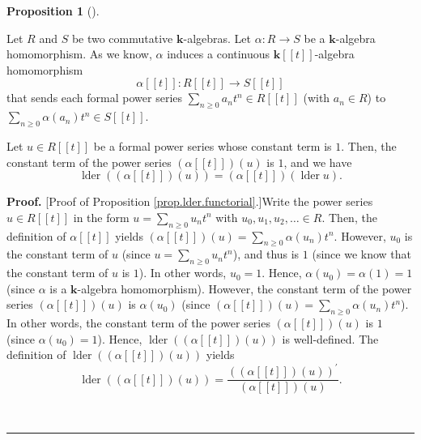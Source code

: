 \documentclass[numbers=enddot,12pt,final,onecolumn,notitlepage]{scrartcl}%
\theoremstyle{definition}
\newtheorem{prop}[theo]{Proposition}
\newenvironment{proposition}[1][]
{\begin{prop}[#1]\begin{leftbar}}
{\end{leftbar}\end{prop}}
\newenvironment{proof}[1][Proof]{\noindent\textbf{#1.} }{\ \rule{0.5em}{0.5em}}
\let\sumnonlimits\sum
\renewcommand{\sum}{\sumnonlimits\limits}
\newenvironment{verlong}{}{}
\begin{document}
\begin{verlong}
\begin{proposition}
\label{prop.lder.functorial}Let $R$ and $S$ be two commutative $\mathbf{k}%
$-algebras. Let $\alpha:R\rightarrow S$ be a $\mathbf{k}$-algebra
homomorphism. As we know, $\alpha$ induces a continuous $\mathbf{k}\left[
\left[  t\right]  \right]  $-algebra homomorphism%
\[
\alpha\left[  \left[  t\right]  \right]  :R\left[  \left[  t\right]  \right]
\rightarrow S\left[  \left[  t\right]  \right]
\]
that sends each formal power series $\sum_{n\geq0}a_{n}t^{n}\in R\left[
\left[  t\right]  \right]  $ (with $a_{n}\in R$) to $\sum_{n\geq0}%
\alpha\left(  a_{n}\right)  t^{n}\in S\left[  \left[  t\right]  \right]  $.

Let $u\in R\left[  \left[  t\right]  \right]  $ be a formal power series whose
constant term is $1$. Then, the constant term of the power series $\left(
\alpha\left[  \left[  t\right]  \right]  \right)  \left(  u\right)  $ is $1$,
and we have%
\[
\operatorname*{lder}\left(  \left(  \alpha\left[  \left[  t\right]  \right]
\right)  \left(  u\right)  \right)  =\left(  \alpha\left[  \left[  t\right]
\right]  \right)  \left(  \operatorname*{lder}u\right)  .
\]

\end{proposition}

\begin{proof}
[Proof of Proposition \ref{prop.lder.functorial}.]Write the power series $u\in
R\left[  \left[  t\right]  \right]  $ in the form $u=\sum_{n\geq0}u_{n}t^{n}$
with $u_{0},u_{1},u_{2},\ldots\in R$. Then, the definition of $\alpha\left[
\left[  t\right]  \right]  $ yields $\left(  \alpha\left[  \left[  t\right]
\right]  \right)  \left(  u\right)  =\sum_{n\geq0}\alpha\left(  u_{n}\right)
t^{n}$. However, $u_{0}$ is the constant term of $u$ (since $u=\sum_{n\geq
0}u_{n}t^{n}$), and thus is $1$ (since we know that the constant term of $u$
is $1$). In other words, $u_{0}=1$. Hence, $\alpha\left(  u_{0}\right)
=\alpha\left(  1\right)  =1$ (since $\alpha$ is a $\mathbf{k}$-algebra
homomorphism). However, the constant term of the power series $\left(
\alpha\left[  \left[  t\right]  \right]  \right)  \left(  u\right)  $ is
$\alpha\left(  u_{0}\right)  $ (since $\left(  \alpha\left[  \left[  t\right]
\right]  \right)  \left(  u\right)  =\sum_{n\geq0}\alpha\left(  u_{n}\right)
t^{n}$). In other words, the constant term of the power series $\left(
\alpha\left[  \left[  t\right]  \right]  \right)  \left(  u\right)  $ is $1$
(since $\alpha\left(  u_{0}\right)  =1$). Hence, $\operatorname*{lder}\left(
\left(  \alpha\left[  \left[  t\right]  \right]  \right)  \left(  u\right)
\right)  $ is well-defined. The definition of $\operatorname*{lder}\left(
\left(  \alpha\left[  \left[  t\right]  \right]  \right)  \left(  u\right)
\right)  $ yields%
\begin{equation}
\operatorname*{lder}\left(  \left(  \alpha\left[  \left[  t\right]  \right]
\right)  \left(  u\right)  \right)  =\dfrac{\left(  \left(  \alpha\left[
\left[  t\right]  \right]  \right)  \left(  u\right)  \right)  ^{\prime}%
}{\left(  \alpha\left[  \left[  t\right]  \right]  \right)  \left(  u\right)
}. \label{pf.prop.lder.functorial.2}%
\end{equation}



\end{proof}
\end{verlong}
\end{document}
